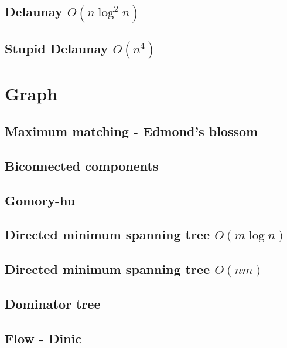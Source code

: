 \subsection{Delaunay $O(n \log^2 n)$}
\raggedbottom
\hrulefill
\subsection{Stupid Delaunay $O(n^4)$}
\raggedbottom
\hrulefill

\section{Graph}
\subsection{Maximum matching - Edmond's blossom}
\raggedbottom
\hrulefill
\subsection{Biconnected components}
\raggedbottom
\hrulefill
\subsection{Gomory-hu}
\raggedbottom
\hrulefill
\subsection{Directed minimum spanning tree $O(m \log n)$}
\raggedbottom
\hrulefill
\subsection{Directed minimum spanning tree $O(nm)$}
\raggedbottom
\hrulefill
\subsection{Dominator tree}
\raggedbottom
\hrulefill
\subsection{Flow - Dinic}
\raggedbottom
\hrulefill
